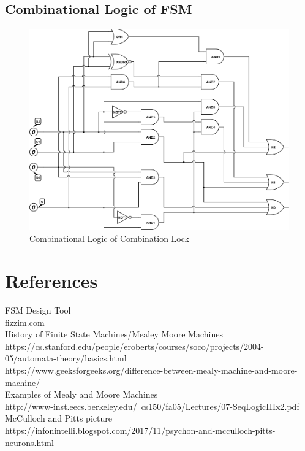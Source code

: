\documentclass{article}
\begin{document}
\subsection{Combinational Logic of FSM}
\begin{figure}[h!]
	\centering
	\includegraphics[scale = 0.75]{logic-circuit-fsm.png}
	\caption {Combinational Logic of Combination Lock}
	\label{fig:comblocklogic}
\end{figure}
\newpage
\section{References}
FSM Design Tool\\
fizzim.com\\

History of Finite State Machines/Mealey Moore Machines\\
https://cs.stanford.edu/people/eroberts/courses/soco/projects/2004-05/automata-theory/basics.html\\
https://www.geeksforgeeks.org/difference-between-mealy-machine-and-moore-machine/\\
Examples of Mealy and Moore Machines \\
http://www-inst.eecs.berkeley.edu/~cs150/fa05/Lectures/07-SeqLogicIIIx2.pdf
\\
McCulloch and Pitts picture \\
https://infonintelli.blogspot.com/2017/11/psychon-and-mcculloch-pitts-neurons.html\\
\end{document}
